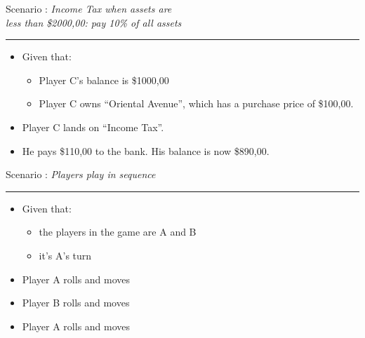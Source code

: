 \documentclass[handout,t,12pt]{beamer}
\newcommand{\Square}[1]{``#1''}
\newcommand{\money}[1]{\$#1,00}
\newcounter{scenarioid}\setcounter{scenarioid}{0}
\newenvironment{scenario}[1]{%
\addtocounter{scenarioid}{1} 
{\Large Scenario \thescenarioid: \emph{#1}\\[3px]\hrule}
\vspace{1\bigskipamount}
}{%
}
\begin{document}
  \begin{frame}
    \begin{scenario}{Income Tax when assets are\\less than \money{2000}: pay 10\% of all assets}
      \begin{itemize}
        \item Given that:
        \begin{itemize}
          \item Player C's balance is \money{1000}
          \item Player C owns \Square{Oriental Avenue}, which has a purchase price of \money{100}.
        \end{itemize}
        \item Player C lands on \Square{Income Tax}.
        \item He pays \money{110} to the bank.  His balance is now \money{890}.
      \end{itemize}
    \end{scenario}
  \end{frame}
  

  \begin{frame}
    \begin{scenario}{Players play in sequence}
      \begin{itemize}
        \item Given that:
        \begin{itemize}
          \item the players in the game are A and B
          \item it's A's turn
        \end{itemize}
        \item Player A rolls and moves
        \item Player B rolls and moves
        \item Player A rolls and moves
      \end{itemize}
    \end{scenario}
  \end{frame}
\end{document}
